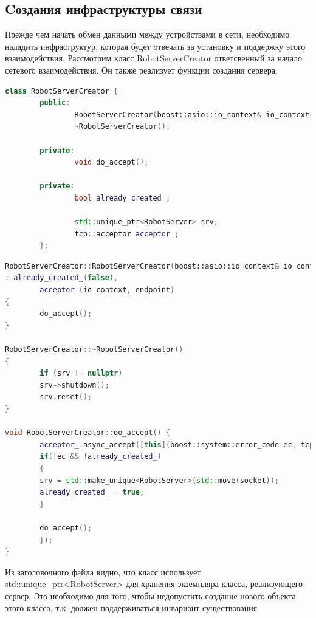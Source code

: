 \documentclass[a4paper, 14pt]{extreport}
\begin{document}
\subsection{Cоздания инфраструктуры связи}
\par Прежде чем начать обмен данными между устройствами в сети, необходимо наладить инфраструктур, которая будет отвечать за установку 
и поддержку этого взаимодействия. Рассмотрим класс RobotServerCreator ответсвенный за начало сетевого взаимодействия. Он также реализует 
функции создания сервера:
\begin{lstlisting}[language=C++, frame=single, xleftmargin=15pt, caption={Заголовочный файл класса RobotServerCreator},label=DescriptiveLabel]
class RobotServerCreator {
        public:
                RobotServerCreator(boost::asio::io_context& io_context, const tcp::endpoint& endpoint);
                ~RobotServerCreator();
                
        private:
                void do_accept();
                
        private:
                bool already_created_;
        
                std::unique_ptr<RobotServer> srv;
                tcp::acceptor acceptor_;
        };
\end{lstlisting}
\begin{lstlisting}[language=C++, frame=single, xleftmargin=15pt, caption={Определение методов класса RobotServerCreator},label=DescriptiveLabel]
RobotServerCreator::RobotServerCreator(boost::asio::io_context& io_context, const tcp::endpoint& endpoint)
: already_created_(false),
        acceptor_(io_context, endpoint)
{
        do_accept();
}

RobotServerCreator::~RobotServerCreator()
{
        if (srv != nullptr)
        srv->shutdown();
        srv.reset();
}

void RobotServerCreator::do_accept() {
        acceptor_.async_accept([this](boost::system::error_code ec, tcp::socket socket) {
        if(!ec && !already_created_)
        {
        srv = std::make_unique<RobotServer>(std::move(socket));
        already_created_ = true;
        }

        do_accept();
        });
}
\end{lstlisting}
\par Из заголовочного файла видно, что класс использует std::unique\_ptr<RobotServer> для хранения экземпляра класса, реализующего сервер.
Это необходимо для того, чтобы недопустить создание нового объекта этого класса, т.к. должен поддерживаться инвариант существования 
\end{document}
